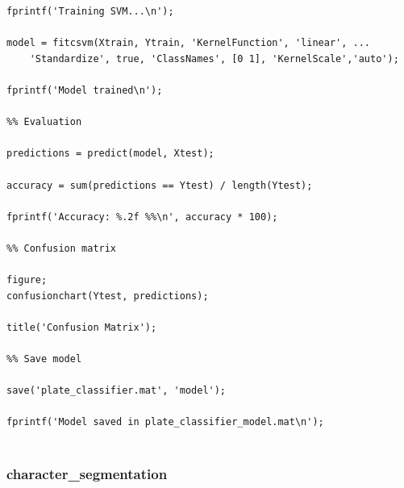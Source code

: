\begin{verbatim}
fprintf('Training SVM...\n');

model = fitcsvm(Xtrain, Ytrain, 'KernelFunction', 'linear', ...
    'Standardize', true, 'ClassNames', [0 1], 'KernelScale','auto');

fprintf('Model trained\n');

%% Evaluation

predictions = predict(model, Xtest);

accuracy = sum(predictions == Ytest) / length(Ytest);

fprintf('Accuracy: %.2f %%\n', accuracy * 100);

%% Confusion matrix

figure;
confusionchart(Ytest, predictions);

title('Confusion Matrix');

%% Save model

save('plate_classifier.mat', 'model');

fprintf('Model saved in plate_classifier_model.mat\n');
    
\end{verbatim}


\subsubsection{character\_segmentation}

